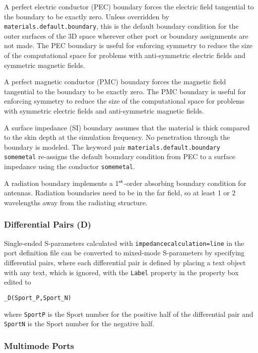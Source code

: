 \documentclass[titlepage]{article}
\renewcommand\_{\textunderscore\linebreak[1]}
\begin{document}
A perfect electric conductor (PEC) boundary forces the electric field tangential to the boundary to be exactly zero.  Unless overridden by \texttt{materials.default.boundary}, this is the default boundary condition for the outer surfaces of the 3D space wherever other port or boundary assignments are not made.  The PEC boundary is useful for enforcing symmetry to reduce the size of the computational space for problems with anti-symmetric electric fields and symmetric magnetic fields.

A perfect magnetic conductor (PMC) boundary forces the magnetic field tangential to the boundary to be exactly zero.  The PMC boundary is useful for enforcing symmetry to reduce the size of the computational space for problems with symmetric electric fields and anti-symmetric magnetic fields.

A surface impedance (SI) boundary assumes that the material is thick compared to the skin depth at the simulation frequency.  No penetration through the boundary is modeled.  The keyword pair \newline \texttt{materials.default.boundary some\_metal} re-assigns the default boundary condition from PEC to a surface impedance using the conductor \texttt{some\_metal}.

A radiation boundary implements a 1$^{\textnormal{st}}$-order absorbing boundary condition for antennas.  Radiation boundaries need to be in the far field, so at least 1 or 2 wavelengths away from the radiating structure. 
\subsubsection{Differential Pairs (\_D)}

Single-ended S-parameters calculated with \texttt{impedance\_calculation=line} in the port definition file can be converted to mixed-mode S-parameters by specifying differential pairs, where each differential pair is defined by placing a text object with any text, which is ignored, with the \texttt{Label} property in the property box edited to
\begin{Verbatim}[fontsize=\small]
  _D(Sport_P,Sport_N)
\end{Verbatim}
\noindent where \texttt{Sport\_P} is the Sport number for the positive half of the differential pair and \texttt{Sport\_N} is the Sport number for the negative half.

\subsubsection{Multimode Ports}
\label{sec:multimode_ports}
\end{document}
